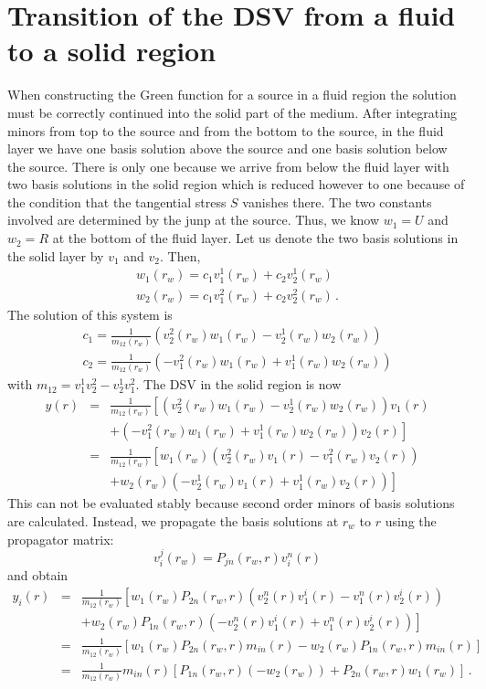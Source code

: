 \documentclass[11pt,a4paper]{article}
\begin{document}
\section{Transition of the DSV from a fluid to a solid region}
%
When constructing the Green function for a source in a fluid region the solution must be correctly continued into the solid part of the medium. After integrating minors from top to the source and from the bottom to the source, in the fluid layer we have one basis solution above the source and one basis solution below the source. There is only one because we arrive from below the fluid layer with two basis solutions in the solid region which is reduced however to one because of the condition that the tangential stress $S$ vanishes there. The two constants involved are determined by the junp at the source. Thus, we know $w_1=U$ and $w_2=R$ at the bottom of the fluid layer. Let us denote the two basis solutions in the solid layer by $v_1$ and $v_2$. Then,
\begin{eqnarray}
w_1(r_w)=c_1 v_1^1(r_w) + c_2 v_2^1(r_w) \nonumber \\
w_2(r_w)=c_1 v_1^2(r_w) + c_2 v_2^2(r_w) \,.
\end{eqnarray}
The solution of this system is
\begin{eqnarray}
c_1 = \frac{1}{m_{12}(r_w)}( v_2^2(r_w) w_1(r_w) - v_2^1(r_w) w_2(r_w)) \nonumber \\
c_2 = \frac{1}{m_{12}(r_w)}(-v_1^2(r_w) w_1(r_w) + v_1^1(r_w) w_2(r_w))
\end{eqnarray}
with $m_{12}=v_1^1 v_2^2 - v_2^1 v_1^2$. The DSV in the solid region is now
\begin{eqnarray}
y(r) & = & \frac{1}{m_{12}(r_w)}\left[( v_2^2(r_w) w_1(r_w) - v_2^1(r_w) w_2(r_w))v_1(r) \right. \nonumber \\
& & +\left.(-v_1^2(r_w) w_1(r_w) + v_1^1(r_w) w_2(r_w)) v_2(r)\right] \nonumber \\
& = & \frac{1}{m_{12}(r_w)}\left[w_1(r_w)(v_2^2(r_w)v_1(r)-v_1^2(r_w)v_2(r))\right. \nonumber \\
& & + \left. w_2(r_w)(-v_2^1(r_w)v_1(r)+v_1^1(r_w)v_2(r))\right]
\end{eqnarray}
This can not be evaluated stably because second order minors of basis solutions are calculated. Instead, we propagate the basis solutions at $r_w$ to $r$ using the propagator matrix:
\begin{equation}
v_i^j(r_w)=P_{jn}(r_w,r)v_i^n(r)
\end{equation}
and obtain 
\begin{eqnarray}
y_i(r) & = & \frac{1}{m_{12}(r_w)}\left[w_1(r_w)P_{2n}(r_w,r)(v_2^n(r)v_1^i(r)-v_1^n(r)v_2^i(r))\right. \nonumber \\
& & + \left. w_2(r_w)P_{1n}(r_w,r)(-v_2^n(r)v_1^i(r)+v_1^n(r)v_2^i(r))\right] \nonumber \\
& = & \frac{1}{m_{12}(r_w)}\left[w_1(r_w)P_{2n}(r_w,r) m_{in}(r) -w_2(r_w)P_{1n}(r_w,r) m_{in}(r)\right] \nonumber \\
& = & \frac{1}{m_{12}(r_w)}m_{in}(r)\left[P_{1n}(r_w,r)(-w_2(r_w))+P_{2n}(r_w,r)w_1(r_w)\right] \,.
\end{eqnarray}
\end{document}
